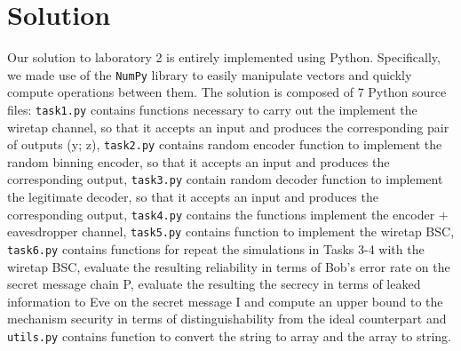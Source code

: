 \documentclass{report}
\begin{document}
\chapter*{Solution}
\par Our solution to laboratory 2 is entirely implemented using Python. Specifically, we made use of the {\tt NumPy} library to easily manipulate vectors and quickly compute operations between them. The solution is composed of 7 Python source files: {\tt task1.py} contains functions necessary to carry out the implement the wiretap channel, so that it accepts an
input  and produces the corresponding pair of outputs (y; z), {\tt task2.py} contains random encoder function to implement the random binning encoder, so that it accepts an input and produces the corresponding output, {\tt task3.py} contain random decoder function to implement the legitimate decoder, so that it accepts an input and produces the corresponding output,  {\tt task4.py} contains the functions implement the encoder + eavesdropper channel, {\tt task5.py}  contains function to implement the wiretap BSC, {\tt task6.py} contains functions for repeat the simulations in Tasks 3-4 with the wiretap BSC, evaluate the resulting reliability in terms of Bob's error rate on the secret message chain P, evaluate the resulting the secrecy in terms of leaked information to Eve on the secret message I and compute an upper bound to the mechanism security in terms of distinguishability from the ideal
counterpart and {\tt utils.py} contains function to convert the string to array and the array to string. 
\end{document}
